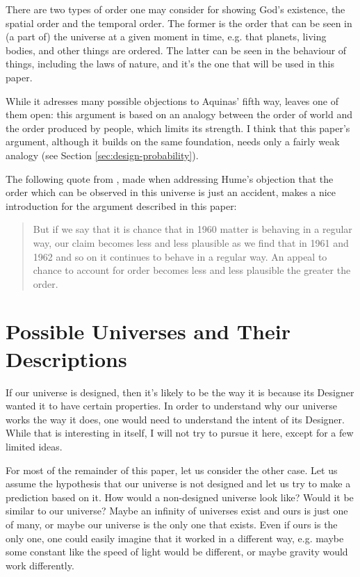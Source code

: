 \documentclass[a4paper
,draft
]{article}
\newcommand{\paper}[1]{paper}
\begin{document}
There are two types of order one may consider for showing God's existence,
the spatial order and the temporal order.
The former is the order that can be seen in (a part of) the universe
at a given moment in time, e.g. that planets, living bodies, and other things
are ordered.
The latter can be seen in the behaviour of things, including the laws of
nature, and it's the one that will be used in this \paper{}.

While it adresses many possible objections to Aquinas' fifth way,
 leaves one of them open:
this argument is based on an analogy between the order of world and the order
produced by people, which limits its strength.
I think that this \paper{}'s argument, although it builds on the same
foundation, needs only a fairly weak analogy
(see Section \ref{sec:design-probability}).

The following quote from \textcite{swinburne1968}, made when addressing
Hume's objection that the order which can be observed in this universe
is just an accident, makes a nice introduction for the argument
described in this \paper{}:
\begin{quote}
But if we say that it is chance that in 1960 matter is behaving in a
regular way, our claim becomes less and less plausible as we find that in
1961 and 1962 and so on it continues to behave in a regular way. An appeal
to chance to account for order becomes less and less plausible
the greater the order.
\end{quote}


\section{Possible Universes and Their Descriptions}
\label{sec:possible-universes}

If our universe is designed, then it's likely to be the way it is because
its Designer wanted it to have certain properties.
In order to understand why our universe works the way it does,
one would need to understand the intent of its Designer.
While that is interesting in itself, I will not try to pursue it here,
except for a few limited ideas.

For most of the remainder of this \paper{}, let us consider the other case.
Let us assume the hypothesis that our universe is not designed
and let us try to make a prediction based on it.
How would a non-designed universe look like?
Would it be similar to our universe?
Maybe an infinity of universes exist and ours is just one of many,
or maybe our universe is the only one that exists.
Even if ours is the only one, one could easily imagine that it worked
in a different way, e.g. maybe some constant like the speed of light would be
different, or maybe gravity would work differently.
\end{document}
